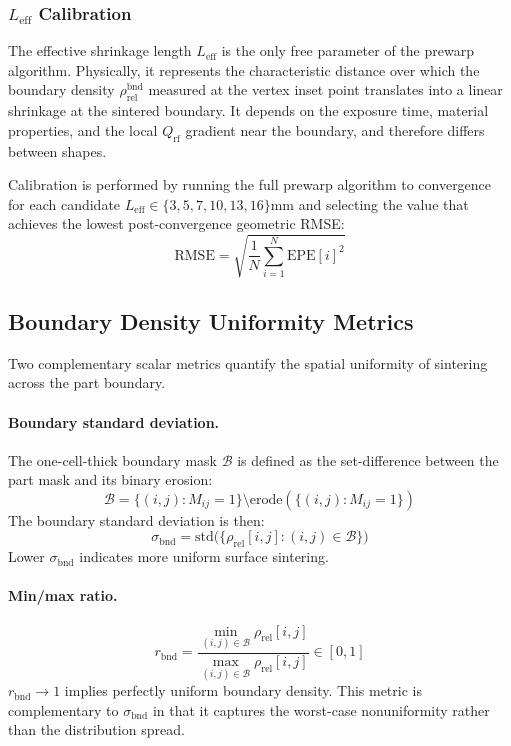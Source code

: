 \documentclass[5p,times]{elsarticle}
\newcommand{\Qrf}{Q_{\mathrm{rf}}}
\newcommand{\bndstd}{\sigma_{\mathrm{bnd}}}
\newcommand{\Leff}{L_{\mathrm{eff}}}
\newcommand{\rhorel}{\rho_{\mathrm{rel}}}
\newcommand{\RMSE}{\mathrm{RMSE}}
\newcommand{\EPE}{\mathrm{EPE}}
\begin{document}
\subsubsection{$\Leff$ Calibration}
\label{sec:leff_calibration}

The effective shrinkage length $\Leff$ is the only free parameter of
the prewarp algorithm.  Physically, it represents the characteristic
distance over which the boundary density $\rhorel^{\mathrm{bnd}}$
measured at the vertex inset point translates into a linear shrinkage
at the sintered boundary.  It depends on the exposure time, material
properties, and the local $\Qrf$ gradient near the boundary, and
therefore differs between shapes.

Calibration is performed by running the full prewarp algorithm to
convergence for each candidate $\Leff \in \{3, 5, 7, 10, 13, 16\}
\si{\milli\meter}$ and selecting the value that achieves the lowest
post-convergence geometric RMSE:
\begin{equation}
  \RMSE = \sqrt{\frac{1}{N}\sum_{i=1}^{N}\EPE[i]^{2}}
  \label{eq:rmse}
\end{equation}

\subsection{Boundary Density Uniformity Metrics}
\label{sec:uniformity_metrics}

Two complementary scalar metrics quantify the spatial uniformity of
sintering across the part boundary.

\paragraph{Boundary standard deviation.}
The one-cell-thick boundary mask $\mathcal{B}$ is defined as the
set-difference between the part mask and its binary erosion:
\begin{equation}
  \mathcal{B} = \{(i,j) : M_{ij} = 1\} \setminus
                \mathrm{erode}(\{(i,j) : M_{ij} = 1\})
  \label{eq:boundary_mask}
\end{equation}
The boundary standard deviation is then:
\begin{equation}
  \bndstd = \mathrm{std}\bigl(\{\rhorel[i,j] : (i,j)\in\mathcal{B}\}\bigr)
  \label{eq:bnd_std}
\end{equation}
Lower $\bndstd$ indicates more uniform surface sintering.

\paragraph{Min/max ratio.}
\begin{equation}
  r_{\mathrm{bnd}} = \frac{\min_{(i,j)\in\mathcal{B}}\rhorel[i,j]}
                         {\max_{(i,j)\in\mathcal{B}}\rhorel[i,j]}
  \in [0, 1]
  \label{eq:minmax_ratio}
\end{equation}
$r_{\mathrm{bnd}} \to 1$ implies perfectly uniform boundary density.
This metric is complementary to $\bndstd$ in that it captures the
worst-case nonuniformity rather than the distribution spread.
\end{document}

